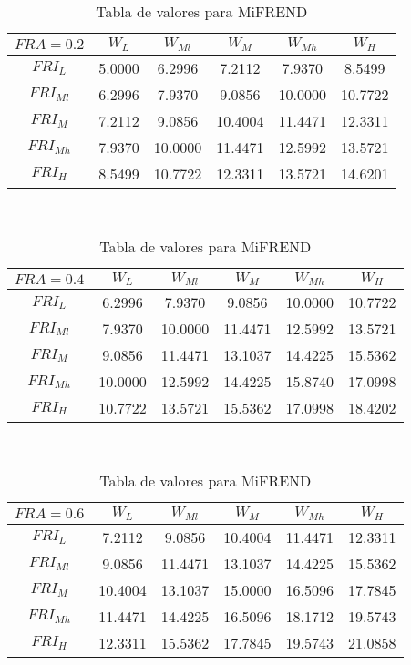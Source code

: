        \begin{table}[h]
    	\caption{Tabla de valores para MiFREND} \label{tab:betas1} 
    	\centering
    \footnotesize 
    	\begin{tabular}{|c||c|c|c|c|c|}
    		\hline
    		$FRA=0.2$	 &$W_L$&$W_{Ml}$&$W_M$&$W_{Mh}$&$W_H$\\
    		\hline  
    		\hline  
    		$FRI_L$&	 5.0000 &   6.2996 &   7.2112 & 7.9370 &  8.5499\\
    		
    		$FRI_{Ml}$&	6.2996  &  7.9370 &   9.0856 &  10.0000  & 10.7722\\
    		
    		$FRI_M$&	7.2112 &   9.0856 &  10.4004 &  11.4471 &  12.3311\\
    		
    		$FRI_{Mh}$&	7.9370 &  10.0000 &  11.4471 &  12.5992 &  13.5721\\
    		
    		$FRI_H$&	8.5499  & 10.7722 &  12.3311 &  13.5721 &  14.6201\\
    		\hline 
    	\end{tabular} \\
    	\bigskip
    	
    	
    	\begin{tabular}{|c||c|c|c|c|c|}
    		\hline
	   		$FRA=0.4$	 &$W_L$&$W_{Ml}$&$W_M$&$W_{Mh}$&$W_H$\\
    		\hline  
    		\hline  
    		$FRI_L$&6.2996&    7.9370  &  9.0856   &10.0000 &  10.7722\\
    		$FRI_{Ml}$&7.9370  & 10.0000 &  11.4471 &  12.5992 &  13.5721\\
    		$FRI_M$&9.0856  & 11.4471  & 13.1037 &  14.4225  & 15.5362\\
    		$FRI_{Mh}$&10.0000 &  12.5992  & 14.4225&   15.8740  & 17.0998\\
    		$FRI_H$&10.7722 &  13.5721  & 15.5362&   17.0998  & 18.4202\\
    		\hline 
    	\end{tabular} 
    	\bigskip
    	\\
    	
    	
    	\begin{tabular}{|c||c|c|c|c|c|}
    		\hline
    		$FRA=0.6$	 &$W_L$&$W_{Ml}$&$W_M$&$W_{Mh}$&$W_H$\\
    		\hline  
    		\hline  
    		$FRI_L$&	7.2112 &   9.0856 &  10.4004 &  11.4471 &  12.3311\\
    		$FRI_{Ml}$&	9.0856  & 11.4471 & 13.1037 &  14.4225  & 15.5362\\
    		$FRI_M$&	10.4004  & 13.1037 &  15.0000 &  16.5096 &  17.7845\\
    		$FRI_{Mh}$&	11.4471  & 14.4225 &  16.5096 &  18.1712 &  19.5743\\
    		$FRI_H$&	12.3311  & 15.5362 &  17.7845 &  19.5743 &  21.0858\\
    		\hline 
    	\end{tabular} \bigskip
    	\\
    	

\end{table}
